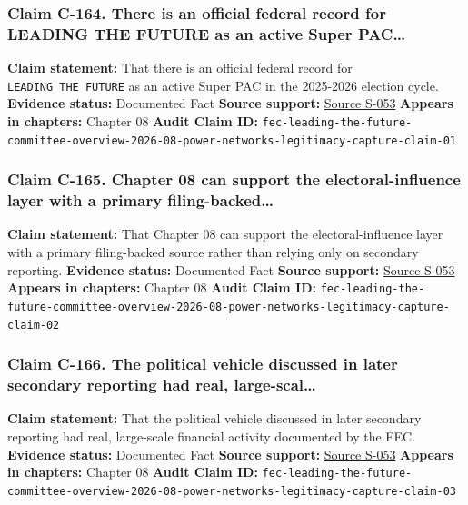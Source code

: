\documentclass[
  american,
  11pt,
  letterpaper,
]{article}
\begin{document}
\subsubsection{Claim C-164. There is an official federal record for
LEADING THE FUTURE as an active Super
PAC\ldots{}}\label{claim-c-164-there-is-an-official-federal-record-for-leading-the-future-as-an-active-super-pac}

\textbf{Claim statement:} That there is an official federal record for
\texttt{LEADING\ THE\ FUTURE} as an active Super PAC in the 2025-2026
election cycle. \textbf{Evidence status:} Documented Fact \textbf{Source
support:}
\hyperref[source-s-053-leading-the-future-committee-overview]{Source
S-053} \textbf{Appears in chapters:} Chapter 08 \textbf{Audit Claim ID:}
\texttt{fec-leading-the-future-committee-overview-2026-08-power-networks-legitimacy-capture-claim-01}

\subsubsection{Claim C-165. Chapter 08 can support the
electoral-influence layer with a primary
filing-backed\ldots{}}\label{claim-c-165-chapter-08-can-support-the-electoral-influence-layer-with-a-primary-filing-backed}

\textbf{Claim statement:} That Chapter 08 can support the
electoral-influence layer with a primary filing-backed source rather
than relying only on secondary reporting. \textbf{Evidence status:}
Documented Fact \textbf{Source support:}
\hyperref[source-s-053-leading-the-future-committee-overview]{Source
S-053} \textbf{Appears in chapters:} Chapter 08 \textbf{Audit Claim ID:}
\texttt{fec-leading-the-future-committee-overview-2026-08-power-networks-legitimacy-capture-claim-02}

\subsubsection{Claim C-166. The political vehicle discussed in later
secondary reporting had real,
large-scal\ldots{}}\label{claim-c-166-the-political-vehicle-discussed-in-later-secondary-reporting-had-real-large-scal}

\textbf{Claim statement:} That the political vehicle discussed in later
secondary reporting had real, large-scale financial activity documented
by the FEC. \textbf{Evidence status:} Documented Fact \textbf{Source
support:}
\hyperref[source-s-053-leading-the-future-committee-overview]{Source
S-053} \textbf{Appears in chapters:} Chapter 08 \textbf{Audit Claim ID:}
\texttt{fec-leading-the-future-committee-overview-2026-08-power-networks-legitimacy-capture-claim-03}
\end{document}
